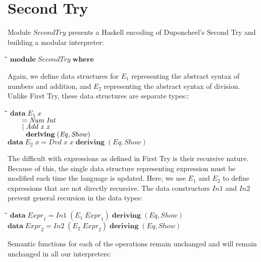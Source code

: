 \documentclass[10pt]{article}
\newlength{\lwidth}\setlength{\lwidth}{4.5cm}
\newlength{\cwidth}\setlength{\cwidth}{8mm} %
\newcommand{\Conid}[1]{\mathit{#1}}
\newcommand{\Varid}[1]{\mathit{#1}}
\begin{document}
\section{Second Try}

Module \ensuremath{\Conid{SecondTry}} presents a Haskell encoding of Duponcheel's Second
Try and building a modular interpreter:

\begin{tabbing}
\qquad\=\hspace{\lwidth}\=\hspace{\cwidth}\=\+\kill
${\mathbf{module}\;\Conid{SecondTry}\;\mathbf{where}}$
\end{tabbing}
Again, we define data structures for \ensuremath{\Varid{E}_1} representing the abstract
syntax of numbers and addition, and \ensuremath{\Varid{E}_2} representing the abstract
syntax of division.  Unlike First Try, these data structures are
separate types::

\begin{tabbing}
\qquad\=\hspace{\lwidth}\=\hspace{\cwidth}\=\+\kill
${\mathbf{data}\;\Varid{E}_1\;\Varid{x}}$\\
${\hskip2.00em\relax\mathrel{=}\Conid{Num}\;\Conid{Int}}$\\
${\hskip2.00em\relax\mid \Conid{Add}\;\Varid{x}\;\Varid{x}}$\\
${\hskip2.00em\relax\phantom{\mid \mbox{}}\mathbf{deriving}\;(\Conid{Eq},\Conid{Show})}$\\
${}$\\
${\mathbf{data}\;\Varid{E}_2\;\Varid{x}\mathrel{=}\Conid{Dvd}\;\Varid{x}\;\Varid{x}\;\mathbf{deriving}\;(\Conid{Eq},\Conid{Show})}$
\end{tabbing}
The difficult with expressions as defined in First Try is their
recursive nature.  Because of this, the single data structure
representing expression must be modified each time the language is
updated.  Here, we use \ensuremath{\Varid{E}_1} and \ensuremath{\Varid{E}_2} to define expressions that are not
directly recursive.  The data constructors \ensuremath{\Conid{In1}} and \ensuremath{\Conid{In2}} prevent
general recursion in the data types:

\begin{tabbing}
\qquad\=\hspace{\lwidth}\=\hspace{\cwidth}\=\+\kill
${\mathbf{data}\;\Varid{Expr}_1\mathrel{=}\Conid{In1}\;(\Varid{E}_1\;\Varid{Expr}_1)\;\mathbf{deriving}\;(\Conid{Eq},\Conid{Show})}$\\
${}$\\
${\mathbf{data}\;\Varid{Expr}_2\mathrel{=}\Conid{In2}\;(\Varid{E}_2\;\Varid{Expr}_2)\;\mathbf{deriving}\;(\Conid{Eq},\Conid{Show})}$
\end{tabbing}
Semantic functions for each of the operations remain unchanged and
will remain unchanged in all our interpreters:
\end{document}
